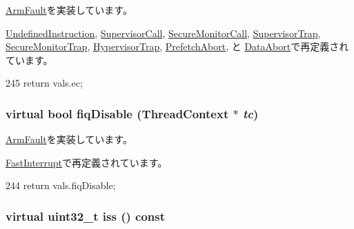 \hyperlink{classArmISA_1_1ArmFault_ab1ac230a4768ca0e080718a7382ecc18}{ArmFault}を実装しています。

\hyperlink{classArmISA_1_1UndefinedInstruction_aefab73b22a74d7c48b8a23230906d7cd}{UndefinedInstruction}, \hyperlink{classArmISA_1_1SupervisorCall_aefab73b22a74d7c48b8a23230906d7cd}{SupervisorCall}, \hyperlink{classArmISA_1_1SecureMonitorCall_aefab73b22a74d7c48b8a23230906d7cd}{SecureMonitorCall}, \hyperlink{classArmISA_1_1SupervisorTrap_aefab73b22a74d7c48b8a23230906d7cd}{SupervisorTrap}, \hyperlink{classArmISA_1_1SecureMonitorTrap_aefab73b22a74d7c48b8a23230906d7cd}{SecureMonitorTrap}, \hyperlink{classArmISA_1_1HypervisorTrap_aefab73b22a74d7c48b8a23230906d7cd}{HypervisorTrap}, \hyperlink{classArmISA_1_1PrefetchAbort_aefab73b22a74d7c48b8a23230906d7cd}{PrefetchAbort}, と \hyperlink{classArmISA_1_1DataAbort_aefab73b22a74d7c48b8a23230906d7cd}{DataAbort}で再定義されています。


\begin{DoxyCode}
245 { return vals.ec; }
\end{DoxyCode}
\hypertarget{classArmISA_1_1ArmFaultVals_a554b3d306d50e92e5d8102124be41fe7}{
\subsubsection[{fiqDisable}]{\setlength{\rightskip}{0pt plus 5cm}virtual bool fiqDisable ({\bf ThreadContext} $\ast$ {\em tc})}}
\label{classArmISA_1_1ArmFaultVals_a554b3d306d50e92e5d8102124be41fe7}


\hyperlink{classArmISA_1_1ArmFault_a90898a2c4e92e85e6cdecddc2d82a621}{ArmFault}を実装しています。

\hyperlink{classArmISA_1_1FastInterrupt_a5f03475ae417a13eb48c2593f9f5b5a6}{FastInterrupt}で再定義されています。


\begin{DoxyCode}
244 { return vals.fiqDisable; }
\end{DoxyCode}
\hypertarget{classArmISA_1_1ArmFaultVals_a1049bf31f8df10c66994603055cf531d}{
\subsubsection[{iss}]{\setlength{\rightskip}{0pt plus 5cm}virtual {\bf uint32\_\-t} iss () const}}
\label{classArmISA_1_1ArmFaultVals_a1049bf31f8df10c66994603055cf531d}


